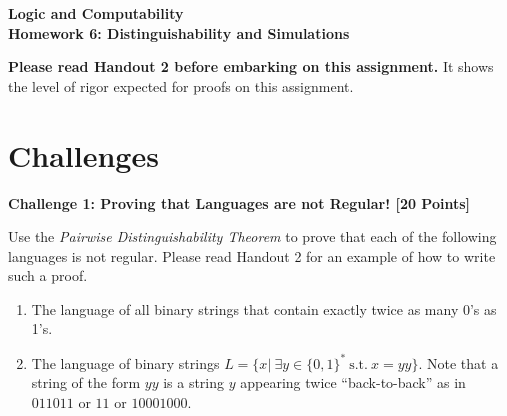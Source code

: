 \documentclass[12pt]{article}
\newcommand{\DoNotShare}{\large \noindent \textbf{Under the Harvey Mudd Honor Code, this document is not to be shared.} \normalsize}
\newcommand{\Problem}[3]{\mbox{} \newline \noindent \textbf{\textbf{Challenge #1: #2 [#3 Points] \\ }}}
\begin{document}
\begin{center}
	\bf
	Logic and Computability  \\
	Homework 6:  Distinguishability and Simulations \\
\end{center}


\textbf{Please read Handout 2 before embarking on this assignment.} It shows the level of rigor expected for proofs on this assignment.

\section*{Challenges}

\Problem{1}{Proving that Languages are not Regular!}{20}

Use the \emph{Pairwise Distinguishability Theorem} to prove that each of the following languages is not regular.  Please read Handout 2 for an example of how to write such a proof.

\begin{enumerate}
	\item The language of all binary strings that contain exactly twice as many 0's as 1's.
	\item The language of binary strings $L = \{x | \ \exists y \in \{ 0, 1\}^{*} \ \mbox{s.t.}\ x = yy \}$.  Note that a string of the form $yy$ is a string $y$ appearing twice ``back-to-back'' as in $011011$ or $11$ or $10001000$.
\end{enumerate}
\end{document}
